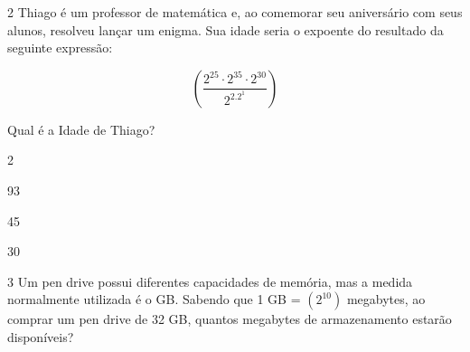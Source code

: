 





\num{2} Thiago é um professor de matemática e, ao comemorar seu aniversário
com seus alunos, resolveu lançar um enigma. Sua idade seria o expoente
do resultado da seguinte expressão:

$$(\frac{2^{25} \cdot 2^{35} \cdot 2^{30}} {2^2.2^1})$$

Qual é a Idade de Thiago?

\begin{escolha}[itemsep=0pt]
\item 2
\item 93
\item 45
\item 30
\end{escolha}










\num{3} Um pen drive possui diferentes capacidades de memória, mas a medida
normalmente utilizada é o GB. Sabendo que 1 GB = $(2^{10})$ megabytes,
ao comprar um pen drive de 32 GB, quantos megabytes de armazenamento
estarão disponíveis?

